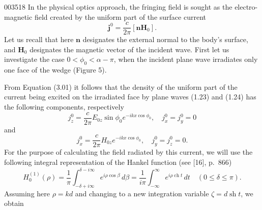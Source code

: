 \begin{scanpage}{0035}{18}
In the physical optics approach, the fringing field is sought as the electro-magnetic field created by the uniform part of the surface current
\[\mathbf j^0=\frac c{2\pi}[\mathbf n\mathbf H_0].\tag{3.01}\]
Let us recall that here $\mathbf n$ designates the external normal to the body's surface, and $\mathbf H_0$ designates the magnetic vector of the incident wave. First let us investigate the case $0<\phi_0<\alpha-\pi$, when the incident plane wave irradiates only one face of the wedge (Figure 5).

From Equation (3.01) it follows that the density of the uniform part of the current being excited on the irradiated face by plane waves (1.23) and (1.24) has the following components, respectively
\[j_z^0=\frac c{2\pi}E_{0z}\sin\phi_0e^{-ikx\cos\phi_0},\quad j_x^0=j_y^0=0\tag{3.02}\]
and
\[j_x^0=\frac c{2\pi}H_{0z}e^{-ikx\cos\phi_0},\quad j_y^0=j_z^0=0.\tag{3.03}\]
For the purpose of calculating the field radiated by this current, we will use the following integral representation of the Hankel function (see [16], p.\ 866)
\[H_0^{(1)}(\rho)=\frac1\pi\int_{-\delta+i\infty}^{\delta-i\infty}e^{i\rho\cos\beta}\,d\beta=\frac1{i\pi}\int_{-\infty}^{\infty}e^{i\rho\operatorname{ch}t}\,dt\quad(0\leq\delta\leq\pi).\tag{3.04}\]
Assuming here $\rho=kd$ and changing to a new integration variable $\zeta=d\operatorname{sh}t$, we obtain
\end{scanpage}
